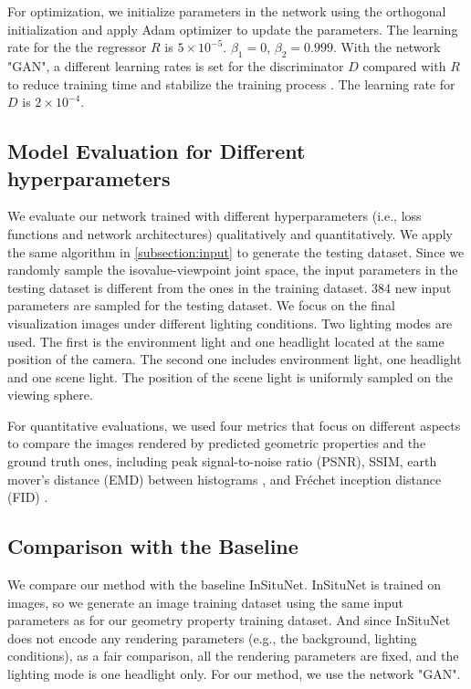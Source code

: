 \documentclass[journal]{vgtc}                %
\begin{document}
For optimization, we initialize parameters in the network using the orthogonal
initialization \cite{saxe2013exact} and apply Adam optimizer \cite{kingma2014adam} to update the parameters. The learning rate for the the regressor $R$ is $5 \times 10^{-5}$. $\beta_1 = 0$, $\beta_2 = 0.999$. With the network "GAN", a different learning rates is set for the discriminator $D$ compared with $R$ to reduce training time and stabilize the training process \cite{roth2017stabilizing}. The learning rate for $D$ is $2 \times 10^{-4}$. 

\subsection{Model Evaluation for Different hyperparameters }
We evaluate our network trained with different hyperparameters (i.e., loss functions and network architectures) qualitatively and quantitatively. We apply the same algorithm in \ref{subsection:input} to generate the testing dataset. Since we randomly sample the isovalue-viewpoint joint space, the input parameters in the testing dataset is different from the ones in the training dataset. 384 new input parameters are sampled for the testing dataset. We focus on the final visualization images under different lighting conditions. Two lighting modes are used. The first is the environment light and one headlight located at the same position of the camera. The second one includes environment light, one headlight and one scene light. The position of the scene light is uniformly sampled on the viewing sphere.   

For quantitative evaluations, we used four metrics that focus on different aspects to compare the images rendered by predicted geometric properties and the ground truth ones, including peak signal-to-noise ratio (PSNR), SSIM, earth mover's distance (EMD) between histograms \cite{berger2018generative}, and Fréchet
inception distance (FID) \cite{heusel2017gans}. 


\subsection{Comparison with the Baseline}
We compare our method with the baseline InSituNet.  InSituNet is trained on images, so we generate an image training dataset using the same input parameters as for our geometry property training dataset. And since InSituNet does not encode any rendering parameters (e.g., the background, lighting conditions), as a fair comparison, all the rendering parameters are fixed, and the lighting mode is one headlight only. For our method, we use the network "GAN". 
\end{document}
